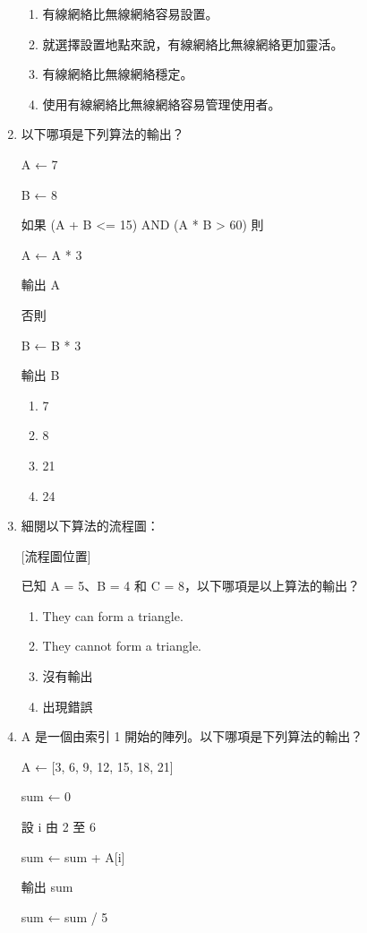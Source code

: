 \documentclass[12pt,a4paper]{article}
\begin{document}
\begin{enumerate}
\begin{enumerate}[label=\Alph*.]
\item 有線網絡比無線網絡容易設置。
\item 就選擇設置地點來說，有線網絡比無線網絡更加靈活。
\item 有線網絡比無線網絡穩定。
\item 使用有線網絡比無線網絡容易管理使用者。
\end{enumerate}

\item 以下哪項是下列算法的輸出？

A ← 7

B ← 8

如果 (A + B <= 15) AND (A * B > 60) 則

A ← A * 3

輸出 A

否則

B ← B * 3

輸出 B

\begin{enumerate}[label=\Alph*.]
\item 7
\item 8
\item 21
\item 24
\end{enumerate}

\item 細閱以下算法的流程圖：

[流程圖位置]

已知 A = 5、B = 4 和 C = 8，以下哪項是以上算法的輸出？

\begin{enumerate}[label=\Alph*.]
\item They can form a triangle.
\item They cannot form a triangle.
\item 沒有輸出
\item 出現錯誤
\end{enumerate}

\item A 是一個由索引 1 開始的陣列。以下哪項是下列算法的輸出？

A ← [3, 6, 9, 12, 15, 18, 21]

sum ← 0

設 i 由 2 至 6

sum ← sum + A[i]

輸出 sum

sum ← sum / 5


\end{enumerate}
\end{document}
